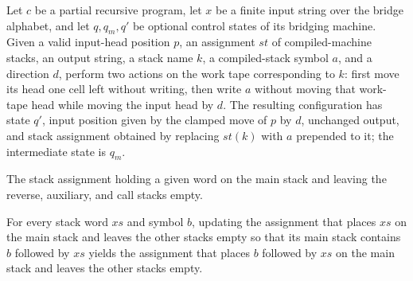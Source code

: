 \begin{lemma}
\label{Turing.bridgeCfg_push_input}
\leanok
{}
Let $c$ be a partial recursive program, let $x$ be a finite input string over the bridge
alphabet, and let $q,q_m,q'$ be optional control states of its bridging machine. Given a
valid input-head position $p$, an assignment $st$ of compiled-machine stacks, an output
string, a stack name $k$, a compiled-stack symbol $a$, and a direction $d$, perform two
actions on the work tape corresponding to $k$: first move its head one cell left without
writing, then write $a$ without moving that work-tape head while moving the input head
by $d$. The resulting configuration has state $q'$, input position given by the clamped
move of $p$ by $d$, unchanged output, and stack assignment obtained by replacing $st(k)$
with $a$ prepended to it; the intermediate state is $q_m$.
\end{lemma}

\begin{definition}
\label{Turing.bridgeStore}
\leanok
The stack assignment holding a given word on the main stack and leaving the reverse,
auxiliary, and call stacks empty.
\end{definition}

\begin{lemma}
\label{Turing.bridgeStore_push}
\leanok
{}
For every stack word $xs$ and symbol $b$, updating the assignment that places $xs$ on
the main stack and leaves the other stacks empty so that its main stack contains $b$
followed by $xs$ yields the assignment that places $b$ followed by $xs$ on the main
stack and leaves the other stacks empty.
\end{lemma}

